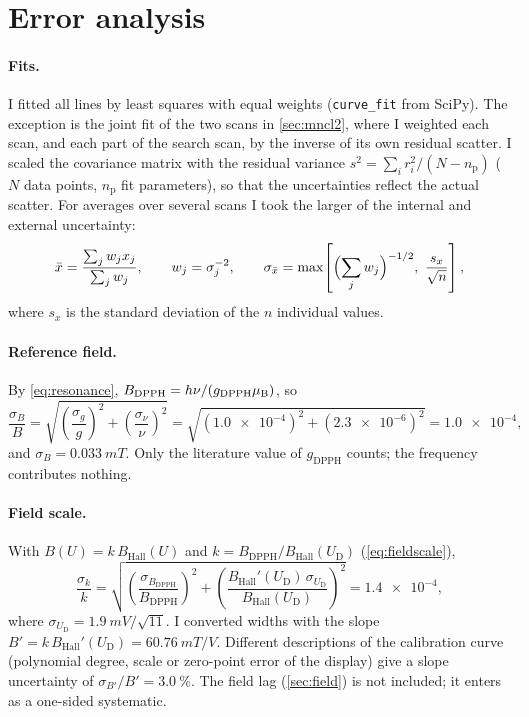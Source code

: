 \section{Error analysis}\label{app:errors}

\paragraph{Fits.}
I fitted all lines by least squares with equal weights (\texttt{curve\_fit} from SciPy). The exception is the joint
fit of the two  scans in \cref{sec:mncl2}, where I weighted each scan, and each part of the search scan,
by the inverse of its own residual scatter. I scaled the covariance matrix with the residual variance
$s^2=\sum_ir_i^2/(N-n_\mathrm p)$ ($N$ data points, $n_\mathrm p$ fit parameters), so that the uncertainties reflect
the actual scatter. For averages over several scans I took the larger of the internal and external uncertainty:
\begin{equation}\label{eq:wmean}
  \bar x=\frac{\sum_jw_jx_j}{\sum_jw_j},\qquad w_j=\sigma_j^{-2},\qquad
  \sigma_{\bar x}=\max\!\left[\Bigl(\sum_jw_j\Bigr)^{-1/2},\ \frac{s_x}{\sqrt n}\right],
\end{equation}
where $s_x$ is the standard deviation of the $n$ individual values.

\paragraph{Reference field.}
By \cref{eq:resonance}, $B_\text{DPPH}=h\nu/(g_\text{DPPH}\mu_\mathrm{B})$, so
\begin{equation}
  \frac{\sigma_B}{B}=\sqrt{\left(\frac{\sigma_g}{g}\right)^2+\left(\frac{\sigma_\nu}{\nu}\right)^2}
  =\sqrt{(\num{1.0e-4})^2+(\num{2.3e-6})^2}=\num{1.0e-4},
\end{equation}
and $\sigma_B=\qty{0.033}{mT}$. Only the literature value of $g_\text{DPPH}$ counts; the frequency contributes nothing.

\paragraph{Field scale.}
With $B(U)=k\,B_\text{Hall}(U)$ and $k=B_\text{DPPH}/B_\text{Hall}(U_\text{D})$ (\cref{eq:fieldscale}),
\begin{equation}
  \frac{\sigma_k}{k}=\sqrt{\left(\frac{\sigma_{B_\text{DPPH}}}{B_\text{DPPH}}\right)^2
  +\left(\frac{B_\text{Hall}'(U_\text{D})\,\sigma_{U_\text{D}}}{B_\text{Hall}(U_\text{D})}\right)^2}
  =\num{1.4e-4},
\end{equation}
where $\sigma_{U_\text{D}}=\qty{1.9}{mV}/\sqrt{11}$. I converted widths with the slope
$B'=k\,B_\text{Hall}'(U_\text{D})=\qty{60.76}{mT/V}$. Different descriptions of the calibration curve
(polynomial degree, scale or zero-point error of the display) give a slope uncertainty of
$\sigma_{B'}/B'=\qty{3.0}{\percent}$. The field lag (\cref{sec:field}) is not included; it enters as a one-sided
systematic.

